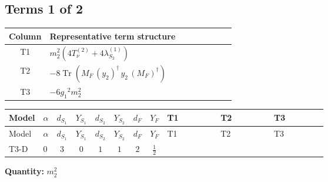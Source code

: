 \documentclass[8pt]{article}
\begin{document}
\begin{landscape}
\subsection*{Terms 1 of 2}
\begin{center}
\begin{tabular}{@{}c >{\raggedright\arraybackslash}p{0.82\linewidth}@{}}
\toprule
Column & Representative term structure \\
\midrule
T1 & \(\displaystyle {m_2^2} (4 T_{\nu}^{(2)}+4 {\lambda_{S_2}^{(1)}})\) \\
\midrule
T2 & \(\displaystyle -8 \operatorname{Tr}\!\left({M_F}\,\left({y_2}\right)^{\dagger}\,{y_2}\,\left({M_F}\right)^{\dagger}\right)\) \\
\midrule
T3 & \(\displaystyle -6 {g_1}^2 {m_2^2}\) \\
\midrule
\bottomrule
\end{tabular}
\end{center}
\smallskip
\tiny
\begin{longtable}{@{}llcccccc >{\raggedright\arraybackslash}p{0.21\linewidth} >{\raggedright\arraybackslash}p{0.21\linewidth} >{\raggedright\arraybackslash}p{0.21\linewidth}@{}}
\toprule
Model & $\alpha$ & $d_{S_1}$ & $Y_{S_1}$ & $d_{S_2}$ & $Y_{S_2}$ & $d_F$ & $Y_F$ & T1 & T2 & T3 \\
\midrule
\endfirsthead
\toprule
Model & $\alpha$ & $d_{S_1}$ & $Y_{S_1}$ & $d_{S_2}$ & $Y_{S_2}$ & $d_F$ & $Y_F$ & T1 & T2 & T3 \\
\midrule
\endhead
T3-D & $0$ & $3$ & $0$ & $1$ & $1$ & $2$ & $\frac{1}{2}$ & \scriptsize\adjustbox{max width=\linewidth}{$\begin{gathered} {m_2^2} (4 T_{\nu}^{(2)}+4 {\lambda_{S_2}^{(1)}})\end{gathered}$} & \scriptsize\adjustbox{max width=\linewidth}{$\begin{gathered} -8 \operatorname{Tr}\!\left({M_F}\,\left({y_2}\right)^{\dagger}\,{y_2}\,\left({M_F}\right)^{\dagger}\right)\end{gathered}$} & \scriptsize\adjustbox{max width=\linewidth}{$\begin{gathered} -6 {g_1}^2 {m_2^2}\end{gathered}$} \\
\midrule
\bottomrule
\end{longtable}
\clearpage
\noindent\textbf{Quantity: }$m_2^2$\par\smallskip

\end{landscape}
\end{document}
